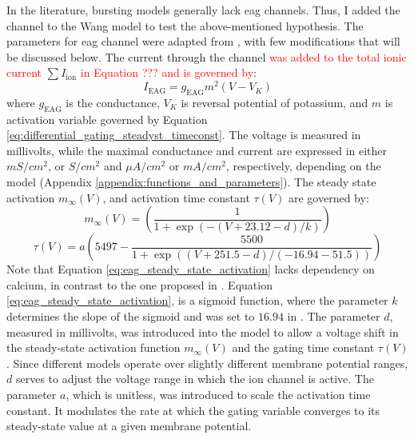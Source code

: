 \documentclass[../main.tex]{subfiles}
\begin{document}
In the literature, bursting models generally lack \gls{eag} channels. Thus, I added the channel to the Wang model to test the above-mentioned hypothesis. The parameters for \gls{eag} channel were adapted from \parencite{bronkRegulationEagCa22018}, with few modifications that will be discussed below. The current through the channel \textcolor{red}{was added to the total ionic current} $\sum I_{\text{ion}}$ \textcolor{red}{in Equation ??? and is governed by}:
\begin{equation*}\label{eq:current_eag}
    I_{\text{EAG}} = g_{\text{EAG}} m^2 (V - V_K)
\end{equation*}
where $g_{\text{EAG}}$ is the conductance, $V_K$ is reversal potential of potassium, and $m$ is activation variable governed by Equation \ref{eq:differential_gating_steadyst_timeconst}. The voltage is measured in millivolts, while the maximal conductance and current are expressed in either $mS/cm^2$, or $S/cm^2$ and $\mu A/cm^2$ or $mA/cm^2$, respectively, depending on the model (Appendix \ref{appendix:functions_and_parameters}). The steady state activation $m_{\infty}(V)$, and activation time constant $\tau(V)$ are governed by:
\begin{equation}\label{eq:eag_steady_state_activation}
    m_\infty(V) = \left( \frac{1}{1 + \exp{(-(V+23.12-d)/k)}} \right)
\end{equation}
\begin{equation} \label{eq:eag_tau_activation}
    \tau(V) = a\left(5497 - \frac{5500}{1 + \exp( (V + 251.5 - d) / (-16.94-51.5) ) }\right)
\end{equation}
Note that Equation \ref{eq:eag_steady_state_activation} lacks dependency on calcium, in contrast to the one proposed in \parencite{bronkRegulationEagCa22018}. Equation \ref{eq:eag_steady_state_activation}, is a sigmoid function, where the parameter $k$ determines the slope of the sigmoid and was set to $16.94$ in \parencite{bronkRegulationEagCa22018}. 
The parameter $d$, measured in millivolts, was introduced into the model to allow a voltage shift in the steady-state activation function  $m_\infty(V)$ and the gating time constant $\tau(V)$. Since different models operate over slightly different membrane potential ranges, $d$ serves to adjust the voltage range in which the ion channel is active.
The parameter $a$, which is unitless, was introduced to scale the activation time constant. It modulates the rate at which the gating variable converges to its steady-state value at a given membrane potential.
\end{document}
